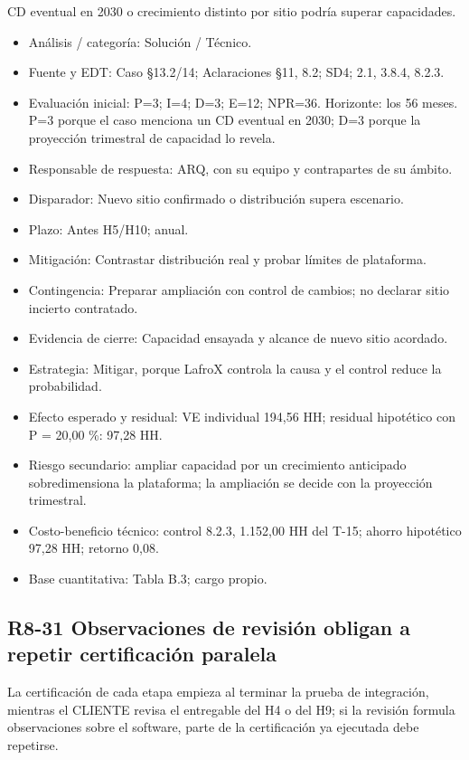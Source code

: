 CD eventual en 2030 o crecimiento distinto por sitio podría superar capacidades.

\begin{itemize}[leftmargin=*,itemsep=3pt]
\item Análisis / categoría: Solución / Técnico.
\item Fuente y EDT: Caso §13.2/14; Aclaraciones §11, 8.2; SD4; 2.1, 3.8.4, 8.2.3.
\item Evaluación inicial: P=3; I=4; D=3; E=12; NPR=36. Horizonte: los 56 meses. P=3 porque el caso menciona un CD eventual en 2030; D=3 porque la proyección trimestral de capacidad lo revela.
\item Responsable de respuesta: ARQ, con su equipo y contrapartes de su ámbito.
\item Disparador: Nuevo sitio confirmado o distribución supera escenario.
\item Plazo: Antes H5/H10; anual.
\item Mitigación: Contrastar distribución real y probar límites de plataforma.
\item Contingencia: Preparar ampliación con control de cambios; no declarar sitio incierto contratado.
\item Evidencia de cierre: Capacidad ensayada y alcance de nuevo sitio acordado.
\item Estrategia: Mitigar, porque LafroX controla la causa y el control reduce la probabilidad.
\item Efecto esperado y residual: VE individual 194,56 HH; residual hipotético con P = 20,00 \%: 97,28 HH.
\item Riesgo secundario: ampliar capacidad por un crecimiento anticipado sobredimensiona la plataforma; la ampliación se decide con la proyección trimestral.
\item Costo-beneficio técnico: control 8.2.3, 1.152,00 HH del T-15; ahorro hipotético 97,28 HH; retorno 0,08.
\item Base cuantitativa: Tabla B.3; cargo propio.
\end{itemize}

\subsection*{R8-31 \textemdash{} Observaciones de revisión obligan a repetir certificación paralela}

La certificación de cada etapa empieza al terminar la prueba de integración, mientras el CLIENTE revisa el entregable del H4 o del H9; si la revisión formula observaciones sobre el software, parte de la certificación ya ejecutada debe repetirse.


